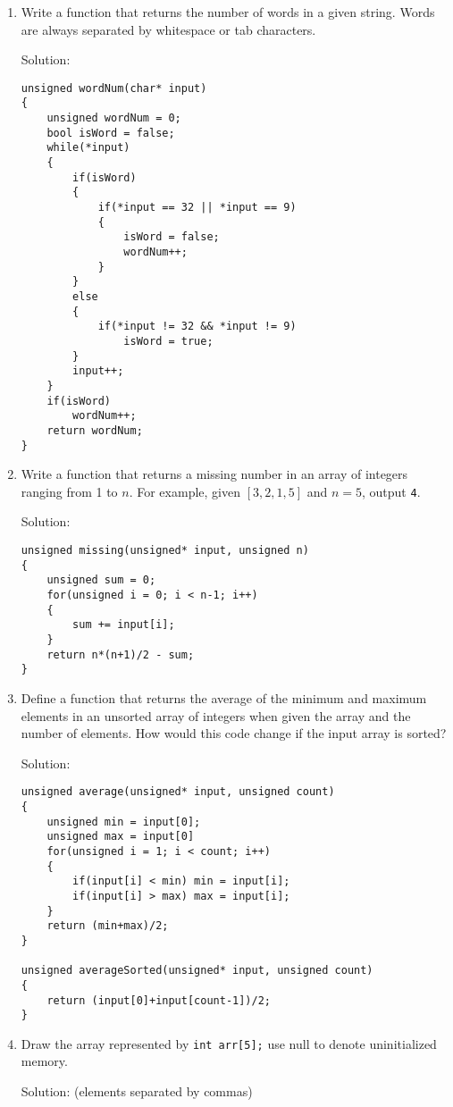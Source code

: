 \documentclass[11pt]{article}
\begin{document}
\begin{enumerate}[leftmargin=*]
\item Write a function that returns the number of words in a given string.  Words are always separated by whitespace or tab characters.

Solution:
\begin{verbatim}
unsigned wordNum(char* input)
{
    unsigned wordNum = 0;
    bool isWord = false;
    while(*input)
    {
        if(isWord)
        {
            if(*input == 32 || *input == 9)
            {
                isWord = false;
                wordNum++;
            }
        }
        else
        {
            if(*input != 32 && *input != 9)
                isWord = true;
        }
        input++;
    }
    if(isWord)
        wordNum++;
    return wordNum;
}
\end{verbatim}

\item Write a function that returns a missing number in an array of integers ranging from 1 to $n$. For example, given $[3, 2, 1, 5]$ and $n=5$, output \verb|4|.

Solution:
\begin{verbatim}
unsigned missing(unsigned* input, unsigned n)
{
    unsigned sum = 0;
    for(unsigned i = 0; i < n-1; i++)
    {
        sum += input[i];
    }
    return n*(n+1)/2 - sum;
}
\end{verbatim}

\item Define a function that returns the average of the minimum and maximum elements in an unsorted array of integers when given the array and the number of elements. How would this code change if the input array is sorted?

Solution:
\begin{verbatim}
unsigned average(unsigned* input, unsigned count)
{
    unsigned min = input[0];
    unsigned max = input[0]
    for(unsigned i = 1; i < count; i++)
    {
        if(input[i] < min) min = input[i];
        if(input[i] > max) max = input[i];
    }
    return (min+max)/2;
}

unsigned averageSorted(unsigned* input, unsigned count)
{
    return (input[0]+input[count-1])/2;
}
\end{verbatim}

\item Draw the array represented by \verb|int arr[5];| use null to denote uninitialized memory.

Solution: (elements separated by commas)


\end{enumerate}
\end{document}
